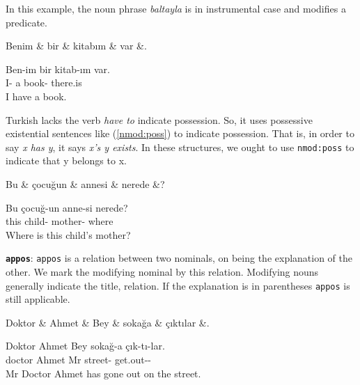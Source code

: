 \documentclass[11pt,a4paper]{article}
\begin{document}
In this example, the noun phrase \textit{baltayla} is in instrumental case and modifies a predicate.

\begin{exe}
\ex \label{nmod:poss}
\begin{dependency}
\begin{deptext}[column sep=0.25cm]
Benim \& bir \& kitabım \& var \&. \\
\end{deptext}
\end{dependency}
\gll Ben-im bir kitab-ım var.  \\
I-\Gen{} a book-\Fsg{} there.is \\
\glt I have a book.
\end{exe}

Turkish lacks the verb \textit{have to} indicate possession. So, it uses possessive existential sentences like (\ref{nmod:poss}) to indicate possession. That is, in order to say \textit{x has y}, it says \textit{x’s y exists}. In these structures, we ought to use \texttt{nmod:poss} to indicate that y belongs to x.

\begin{exe}
\ex \label{nmod:poss2}
\begin{dependency}
\begin{deptext}[column sep=0.25cm]
Bu \& çocuğun \& annesi \& nerede \&? \\
\end{deptext}
\end{dependency}
\gll Bu çocuğ-un anne-si nerede?  \\
this child-\Gen{} mother-\Tsg{} where \\
\glt Where is this child’s mother?
\end{exe}

\textbf{\texttt{appos}}:
\texttt{appos} is a relation between two nominals, on being the explanation of the other. We mark the modifying nominal by this relation. Modifying nouns generally indicate the title, relation. If the explanation is in parentheses \texttt{appos} is still applicable.

\begin{exe}
\ex \label{appos}
\begin{dependency}
\begin{deptext}[column sep=0.25cm]
Doktor \& Ahmet \& Bey \& sokağa \& çıktılar \&. \\
\end{deptext}
\end{dependency}
\gll Doktor Ahmet Bey sokağ-a çık-tı-lar.  \\
doctor Ahmet Mr street-\Loc{} get.out-\Pst{}-\Tpl{}\\
\glt Mr Doctor Ahmet has gone out on the street.
\end{exe}
\end{document}
